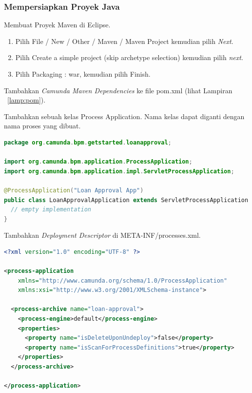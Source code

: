 \subsubsection{Mempersiapkan Proyek Java}
\label{proyekjava}
\begin{description}
	\item Membuat Proyek Maven di Eclipse. 
		\begin{enumerate}
			\item Pilih File / New / Other / Maven / Maven Project kemudian pilih \textit{Next}.
			\item Pilih Create a simple project (skip archetype selection) kemudian pilih \textit{next}.
			\item Pilih Packaging : war, kemudian pilih Finish.
		\end{enumerate}
	\item Tambahkan \textit{Camunda Maven Dependencies} ke file pom.xml (lihat Lampiran ~\ref{lamp:pom}).
	\item Tambahkan sebuah kelas Process Application. Nama kelas dapat diganti dengan nama proses yang dibuat. 
	\begin{lstlisting}[language=java,basicstyle=\tiny,caption=Kelas Process Application]
	package org.camunda.bpm.getstarted.loanapproval;

import org.camunda.bpm.application.ProcessApplication;
import org.camunda.bpm.application.impl.ServletProcessApplication;

@ProcessApplication("Loan Approval App")
public class LoanApprovalApplication extends ServletProcessApplication {
  // empty implementation
}
	\end{lstlisting}
	\item Tambahkan \textit{Deployment Descriptor} di META-INF/processes.xml.
	
	\begin{lstlisting}[language=xml,basicstyle=\tiny,caption=processes.xml]	
	<?xml version="1.0" encoding="UTF-8" ?>

<process-application
    xmlns="http://www.camunda.org/schema/1.0/ProcessApplication"
    xmlns:xsi="http://www.w3.org/2001/XMLSchema-instance">

  <process-archive name="loan-approval">
    <process-engine>default</process-engine>
    <properties>
      <property name="isDeleteUponUndeploy">false</property>
      <property name="isScanForProcessDefinitions">true</property>
    </properties>
  </process-archive>

</process-application>
	\end{lstlisting}
	
\end{description}

